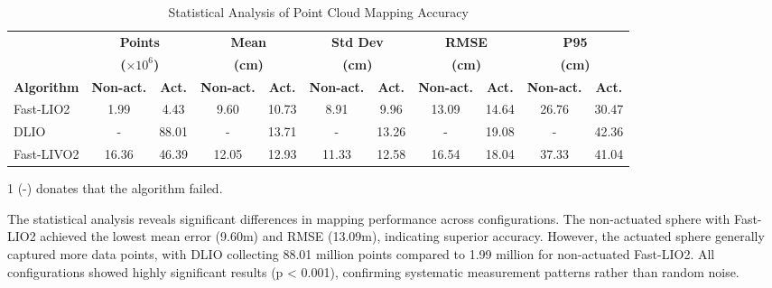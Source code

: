 \documentclass[conference]{IEEEtran}
\begin{document}
\begin{table}[htbp]
\centering
\begin{threeparttable}
\caption{Statistical Analysis of Point Cloud Mapping Accuracy}
\label{tab:point_cloud_error}
\begin{tabular}{l|cc|cc|cc|cc|cc}
\toprule
& \multicolumn{2}{c|}{\textbf{Points}} & \multicolumn{2}{c|}{\textbf{Mean}} & \multicolumn{2}{c|}{\textbf{Std Dev}} & \multicolumn{2}{c|}{\textbf{RMSE}} & \multicolumn{2}{c}{\textbf{P95}} \\
& \multicolumn{2}{c|}{\textbf{($\times 10^6$)}} & \multicolumn{2}{c|}{\textbf{(cm)}} & \multicolumn{2}{c|}{\textbf{(cm)}} & \multicolumn{2}{c|}{\textbf{(cm)}} & \multicolumn{2}{c}{\textbf{(cm)}} \\
\cmidrule(r){2-3} \cmidrule(lr){4-5} \cmidrule(lr){6-7} \cmidrule(lr){8-9} \cmidrule(l){10-11}
\textbf{Algorithm} & \textbf{Non-act.} & \textbf{Act.} & \textbf{Non-act.} & \textbf{Act.} & \textbf{Non-act.} & \textbf{Act.} & \textbf{Non-act.} & \textbf{Act.} & \textbf{Non-act.} & \textbf{Act.} \\
\midrule
Fast-LIO2 & 1.99 & 4.43 & 9.60 & 10.73 & 8.91 & 9.96 & 13.09 & 14.64 & 26.76 & 30.47 \\
DLIO & - & 88.01 & - & 13.71 & - & 13.26 & - & 19.08 & - & 42.36 \\
Fast-LIVO2 & 16.36 & 46.39 & 12.05 & 12.93 & 11.33 & 12.58 & 16.54 & 18.04 & 37.33 & 41.04 \\
\bottomrule
\end{tabular}
\begin{tablenotes}
    \item[1] (-) donates that the algorithm failed. %
\end{tablenotes}
\end{threeparttable}
\end{table}

The statistical analysis reveals significant differences in mapping performance across configurations. The non-actuated sphere with Fast-LIO2 achieved the lowest mean error (9.60m) and RMSE (13.09m), indicating superior accuracy. However, the actuated sphere generally captured more data points, with DLIO collecting 88.01 million points compared to 1.99 million for non-actuated Fast-LIO2. All configurations showed highly significant results (p < 0.001), confirming systematic measurement patterns rather than random noise. 
\end{document}
